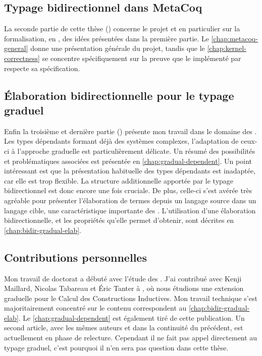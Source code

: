 \subsection{Typage bidirectionnel dans MetaCoq}

La seconde partie de cette thèse ()
concerne le projet 
et en particulier sur la formalisation, en , des idées présentées dans la
première partie. Le \cref{chap:metacoq-general} donne une présentation générale du
projet, tandis que le \cref{chap:kernel-correctness} se concentre spécifiquement
sur la preuve que le  implémenté par  respecte sa spécification.

\subsection{Élaboration bidirectionnelle pour le typage graduel}

Enfin la troisième et dernière partie ()
présente mon travail
dans le domaine des . Les types dépendants formant déjà des systèmes
complexes, l’adaptation de ceux-ci à l’approche graduelle est particulièrement
délicate. Un résumé des possibilités et problématiques associées est présentée
en \cref{chap:gradual-dependent}.
Un point intéressant est que la présentation habituelle
des types dépendants est inadaptée,
car elle est trop flexible. La structure additionnelle apportée
par le typage bidirectionnel est donc encore une fois cruciale.
De plus, celle-ci s’est avérée très agréable pour présenter
l’élaboration de termes depuis un langage source dans un langage cible, une
caractéristique importante des .
L’utilisation d’une élaboration bidirectionnelle, et les propriétés qu’elle
permet d’obtenir, sont décrites en \cref{chap:bidir-gradual-elab}.

\subsection{Contributions personnelles}

Mon travail de doctorat a débuté avec l’étude des  .
J’ai contribué avec Kenji Maillard, Nicolas Tabareau et Éric Tanter à
, où nous étudions une extension graduelle
pour le Calcul des Constructions Inductives. Mon travail technique s’est
majoritairement concentré sur le contenu correspondent au \cref{chap:bidir-gradual-elab}.
Le \cref{chap:gradual-dependent} est également tiré de cette publication.
Un second article, avec les mêmes auteurs et dans la continuité du précédent,
est actuellement en phase de relecture. Cependant il
ne fait pas appel directement au typage graduel, c’est pourquoi il n’en
sera pas question dans cette thèse.

